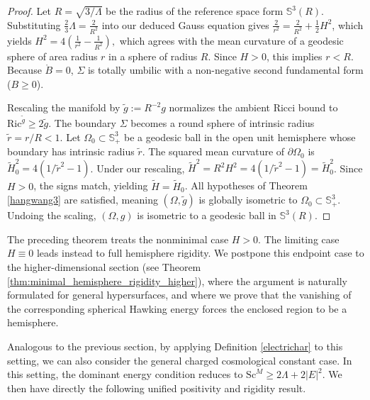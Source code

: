 \documentclass[12pt,a4paper]{amsart}
\theoremstyle{plain}
\theoremstyle{definition}
\begin{document}
\begin{proof}
Let $R = \sqrt{3/\Lambda}$ be the radius of the reference space form $\mathbb{S}^3(R)$. Substituting $\frac{2}{3}\Lambda = \frac{2}{R^2}$ into our deduced Gauss equation gives $\frac{2}{r^2} = \frac{2}{R^2} + \frac{1}{2}H^2$, which yields $H^2 = 4\left(\frac{1}{r^2} - \frac{1}{R^2}\right),$ which agrees with the mean curvature of a geodesic sphere of area radius $r$ in a sphere of radius $R$.
Since $H > 0$, this implies $r < R$. Because $\mathring{B} = 0$, $\Sigma$ is totally umbilic with a non-negative second fundamental form ($B \ge 0$). 

Rescaling the manifold by $\tilde{g} := R^{-2}g$ normalizes the ambient Ricci bound to $\mathrm{Ric}^{\tilde{g}} \ge 2\tilde{g}$. The boundary $\Sigma$ becomes a round sphere of intrinsic radius $\tilde{r} = r/R < 1$. Let $\Omega_0 \subset \mathbb{S}^3_+$ be a  geodesic ball in the open unit hemisphere whose boundary has intrinsic radius $\tilde{r}$. The squared mean curvature of $\partial\Omega_0$ is $\tilde{H}_0^2 = 4(1/\tilde{r}^2 - 1)$. Under our rescaling, $\tilde{H}^2 = R^2 H^2 = 4 (1/\tilde{r}^2 - 1) = \tilde{H}_0^2$. Since $H > 0$, the signs match, yielding $\tilde{H} = \tilde{H}_0$. All hypotheses of Theorem \ref{hangwang3} are satisfied, meaning $(\Omega, \tilde{g})$ is globally isometric to $\Omega_0 \subset \mathbb{S}^3_+$. Undoing the scaling, $(\Omega, g)$ is isometric to a  geodesic ball in $\mathbb{S}^3(R)$.
\end{proof}
The preceding theorem treats the nonminimal case $H>0$. The limiting case $H\equiv 0$ leads instead to full hemisphere rigidity. We postpone this endpoint case to the higher-dimensional section (see Theorem \ref{thm:minimal_hemisphere_rigidity_higher}), where the argument is naturally formulated for general hypersurfaces, and where we prove that the vanishing of the corresponding spherical Hawking energy forces the enclosed region to be a hemisphere. 




Analogous to the previous section, by applying Definition \ref{electrichar} to this setting, we can also consider the general charged cosmological constant case. In this setting, the dominant energy condition reduces to $\mathrm{Sc}^M \ge 2 \Lambda +2|E|^2$. We then have directly the following unified positivity and rigidity result.
\end{document}
